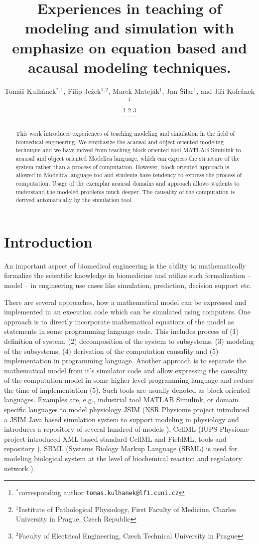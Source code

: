 \documentclass[letterpaper, 10 pt, conference]{ieeeconf}  %
\title{\LARGE \bf
Experiences in teaching of modeling and simulation with emphasize on equation based and acausal modeling techniques.
}
\author{\parbox{3 in}{
Tomáš Kulhánek$^{*,1}$, 
Filip Ježek$^{1,2}$, 
Marek Mateják$^{1}$,  
Jan Šilar$^{1}$, 
and Jiří Kofránek$^{1}$}%
\thanks{$^{*}$corresponding author {\tt\small tomas.kulhanek@lf1.cuni.cz}}%
\thanks{$^{1}$Institute of Pathological Physiology, First Faculty of Medicine, Charles University in Prague, Czech Republic}%
\thanks{$^{2}$Faculty of Electrical Engineering, Czech Technical University in Prague}%
}
\begin{document}
\maketitle
\thispagestyle{empty}
\pagestyle{empty}


\begin{abstract}

This work introduces experiences of teaching modeling and simulation in the field of biomedical engineering. We emphasize the acausal and object-oriented modeling technique and we have moved from teaching block-oriented tool MATLAB Simulink to acausal and object oriented Modelica language, which can express the structure of the system rather than a process of computation. 
However, block-oriented approach is allowed in Modelica language too and students have tendency to express the process of computation. Usage of the exemplar acausal domains and approach allows students to understand the modeled problems much deeper. The causality of the computation is derived automatically by the simulation tool.
\end{abstract}


\section{Introduction}
An important aspect of biomedical engineering is the ability to mathematically formalize the scientific knowledge in biomedicine and utilize such formalization -- model -- in engineering use cases like simulation, prediction, decision support etc. 

There are several approaches, how a mathematical model can be expressed and implemented in an execution code which can be simulated using computers. One approach is to directly incorporate mathematical equations of the model as statements in some programming language code. This includes process of (1) definition of system, (2) decomposition of the system to subsystems, (3) modeling of the subsystems, (4) derivation of the computation causality and (5) implementation in programming language.
Another approach is to separate the mathematical model from it's simulator code and allow expressing the causality of the computation model in some higher level programming language and reduce the time of implementation (5). Such tools are usually denoted as block oriented languages. Examples are, e.g., industrial tool MATLAB Simulink, or domain specific languages to model physiology JSIM (NSR Physiome project introduced a JSIM Java based simulation system to support modeling in  physiology and introduces a repository of several hundred of models \cite{Butterworth2014}), CellML (IUPS Physiome project introduced XML based standard CellML and FieldML, tools and repository \cite{Hunter2004,Yu2011}), SBML (Systems Biology Markup Language (SBML) is used for modeling biological system at the level of biochemical reaction and regulatory network \cite{Hucka2004}).
\end{document}
